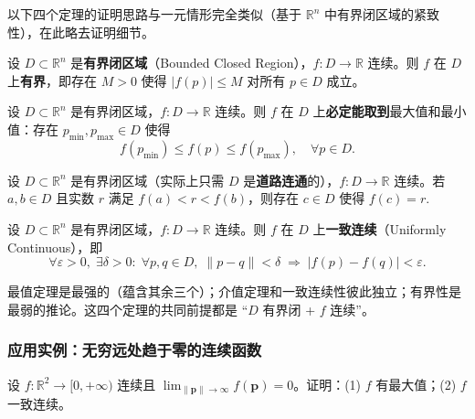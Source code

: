 \documentclass[lang=cn,11pt]{elegantbook}
\begin{document}
以下四个定理的证明思路与一元情形完全类似（基于 $\mathbb{R}^n$ 中有界闭区域的紧致性），在此略去证明细节。

\begin{theorem}[有界性定理] \label{thm:cont-bounded}
设 $D\subset\mathbb{R}^n$ 是\textbf{有界闭区域}（Bounded Closed Region），$f:D\to\mathbb{R}$ 连续。则 $f$ 在 $D$ 上\textbf{有界}，即存在 $M>0$ 使得 $|f(p)|\leqslant  M$ 对所有 $p\in D$ 成立。
\end{theorem}

\begin{theorem} \label{thm:cont-extreme}
设 $D\subset\mathbb{R}^n$ 是有界闭区域，$f:D\to\mathbb{R}$ 连续。则 $f$ 在 $D$ 上\textbf{必定能取到}最大值和最小值：存在 $p_{\min},p_{\max}\in D$ 使得
\[
f(p_{\min})\leqslant  f(p)\leqslant  f(p_{\max}),\quad\forall p\in D.
\]
\end{theorem}

\begin{theorem} \label{thm:cont-intermediate}
设 $D\subset\mathbb{R}^n$ 是有界闭区域（实际上只需 $D$ 是\textbf{道路连通}的），$f:D\to\mathbb{R}$ 连续。若 $a,b\in D$ 且实数 $r$ 满足 $f(a)<r<f(b)$，则存在 $c\in D$ 使得 $f(c)=r$.
\end{theorem}

\begin{theorem} \label{thm:cont-uniform}
设 $D\subset\mathbb{R}^n$ 是有界闭区域，$f:D\to\mathbb{R}$ 连续。则 $f$ 在 $D$ 上\textbf{一致连续}（Uniformly Continuous），即
\[
\forall\varepsilon>0,\;\exists\delta>0:\;
\forall p,q\in D,\;\|p-q\|<\delta\;\Longrightarrow\;|f(p)-f(q)|<\varepsilon.
\]
\end{theorem}

\begin{note}[四大定理之间的关系]
最值定理是最强的（蕴含其余三个）；介值定理和一致连续性彼此独立；有界性是最弱的推论。这四个定理的共同前提都是 ``$D$ 有界闭 + $f$ 连续''。
\end{note}


\subsubsection{应用实例：无穷远处趋于零的连续函数}

\begin{exercise}[最大值与一致连续性] \label{ex:inf-zero-extreme-unif}
设 $f:\mathbb{R}^2\to[0,+\infty)$ 连续且 $\displaystyle\lim_{\|\boldsymbol{p}\|\to\infty}f(\boldsymbol{p})=0$。证明：(1) $f$ 有最大值；(2) $f$ 一致连续。
\end{exercise}
\end{document}
